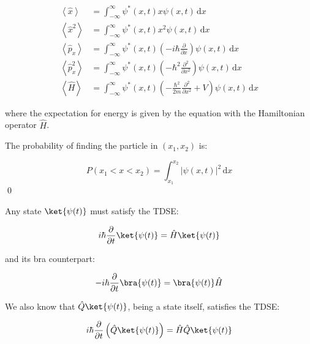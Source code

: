 \documentclass[12pt]{article}
\begin{document}

\begin{equation}
    \begin{split}
        \left\langle \hat{x} \right\rangle &= \int_{-\infty}^{\infty} \psi^{*}(x,t) x \psi(x,t) \, \mathrm{d}x \\
        \left\langle \hat{x}^{2} \right\rangle &= \int_{-\infty}^{\infty} \psi^{*}(x,t) x^{2} \psi(x,t) \, \mathrm{d}x \\
        \left\langle \hat{p}_{x} \right\rangle &= \int_{-\infty}^{\infty} \psi^{*}(x,t) \left( -i\hbar \frac{\partial}{\partial x} \right) \psi(x,t) \, \mathrm{d}x \\
        \left\langle \hat{p}_{x}^{2} \right\rangle &= \int_{-\infty}^{\infty} \psi^{*}(x,t) \left( -\hbar^{2} \frac{\partial^{2}}{\partial x^{2}} \right) \psi(x,t) \, \mathrm{d}x \\
        \left\langle \hat{H} \right\rangle &= \int_{-\infty}^{\infty} \psi^{*}(x,t) \left( -\frac{\hbar^{2}}{2m} \frac{\partial^{2}}{\partial x^{2}} + V \right) \psi(x,t) \, \mathrm{d}x
    \end{split}
\end{equation}

where the expectation for energy is given by the equation with the Hamiltonian operator $\hat{H}$.

The probability of finding the particle in $(x_{1}, x_{2})$ is:

\begin{equation}
    P(x_{1} < x < x_{2}) = \int_{x_{1}}^{x_{2}} \left| \psi(x,t) \right|^{2} \, \mathrm{d}x
\end{equation}
\qed


Any state $\ket{\psi(t)}$ must satisfy the TDSE:

\begin{equation}
    i\hbar \frac{\partial}{\partial t} \ket{\psi(t)} = \hat{H} \ket{\psi(t)}
\end{equation}

and its bra counterpart:

\begin{equation}
    -i\hbar \frac{\partial}{\partial t} \bra{\psi(t)} = \bra{\psi(t)} \hat{H}
\end{equation}

We also know that $\hat{Q} \ket{\psi(t)}$, being a state itself, satisfies the TDSE:

\begin{equation}
    i\hbar \frac{\partial}{\partial t} \left( \hat{Q} \ket{\psi(t)} \right) = \hat{H} \hat{Q} \ket{\psi(t)}
\end{equation}
\end{document}
